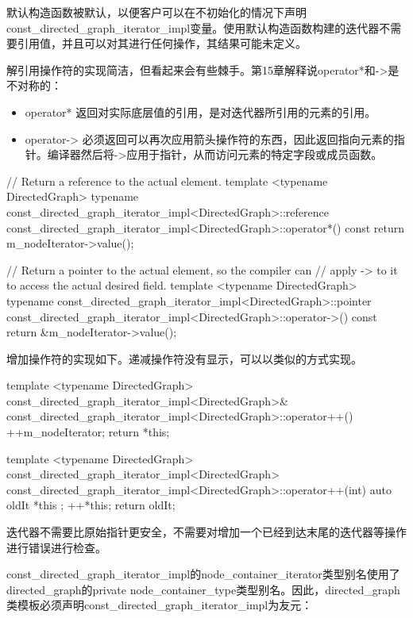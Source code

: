 默认构造函数被默认，以便客户可以在不初始化的情况下声明const\_directed\_graph\_iterator\_impl变量。使用默认构造函数构建的迭代器不需要引用值，并且可以对其进行任何操作，其结果可能未定义。

解引用操作符的实现简洁，但看起来会有些棘手。第15章解释说operator*和->是不对称的：

\begin{itemize}
\item
operator* 返回对实际底层值的引用，是对迭代器所引用的元素的引用。

\item
operator-> 必须返回可以再次应用箭头操作符的东西，因此返回指向元素的指针。编译器然后将->应用于指针，从而访问元素的特定字段或成员函数。
\end{itemize}

\begin{cpp}
// Return a reference to the actual element.
template <typename DirectedGraph>
typename const_directed_graph_iterator_impl<DirectedGraph>::reference
    const_directed_graph_iterator_impl<DirectedGraph>::operator*() const
{
    return m_nodeIterator->value();
}

// Return a pointer to the actual element, so the compiler can
// apply -> to it to access the actual desired field.
template <typename DirectedGraph>
typename const_directed_graph_iterator_impl<DirectedGraph>::pointer
    const_directed_graph_iterator_impl<DirectedGraph>::operator->() const
{
    return &m_nodeIterator->value();
}
\end{cpp}

增加操作符的实现如下。递减操作符没有显示，可以以类似的方式实现。

\begin{cpp}
template <typename DirectedGraph>
const_directed_graph_iterator_impl<DirectedGraph>&
    const_directed_graph_iterator_impl<DirectedGraph>::operator++()
{
    ++m_nodeIterator;
    return *this;
}

template <typename DirectedGraph>
const_directed_graph_iterator_impl<DirectedGraph>
    const_directed_graph_iterator_impl<DirectedGraph>::operator++(int)
{
    auto oldIt { *this };
    ++*this;
    return oldIt;
}
\end{cpp}

迭代器不需要比原始指针更安全，不需要对增加一个已经到达末尾的迭代器等操作进行错误进行检查。

const\_directed\_graph\_iterator\_impl的node\_container\_iterator类型别名使用了directed\_graph的private node\_container\_type类型别名。因此，directed\_graph类模板必须声明const\_directed\_graph\_iterator\_impl为友元：

